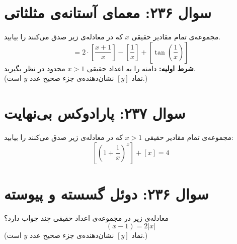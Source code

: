 \documentclass[12pt]{article}
\begin{document}
\section*{سوال ۲۳۶: معمای آستانه‌ی مثلثاتی}
مجموعه‌ی تمام مقادیر حقیقی \(x\) که در معادله‌ی زیر صدق می‌کنند را بیابید.
\begin{displaymath}
	[x] = 2 \cdot \left[\frac{x+1}{x}\right] - \left[\frac{1}{x}\right] + [\tan(\frac{1}{x})]
\end{displaymath}
\textbf{شرط اولیه:} دامنه را به اعداد حقیقی \(x > 1\) محدود در نظر بگیرید.\\
(نماد \( [y] \) نشان‌دهنده‌ی جزء صحیح عدد \(y\) است.)

\vspace{1cm}
\hrulefill
\vspace{1cm}

\section*{سوال ۲۳۷: پارادوکس بی‌نهایت}
مجموعه‌ی تمام مقادیر حقیقی \(x > 1\) که در معادله‌ی زیر صدق می‌کنند را بیابید:
\begin{displaymath}
	\left[ \left(1 + \frac{1}{x}\right)^x \right] + [x] = 4
\end{displaymath}

\vspace{1cm}
\hrulefill
\vspace{1cm}

\section*{سوال ۲۳۶: دوئل گسسته و پیوسته}
معادله‌ی زیر در مجموعه‌ی اعداد حقیقی چند جواب دارد؟
\begin{displaymath}
	[x](x - 1) = 2|x|
\end{displaymath}
(نماد \( [y] \) نشان‌دهنده‌ی جزء صحیح عدد \(y\) است.)

\vspace{1cm}
\hrulefill
\vspace{1cm}

\end{document}
